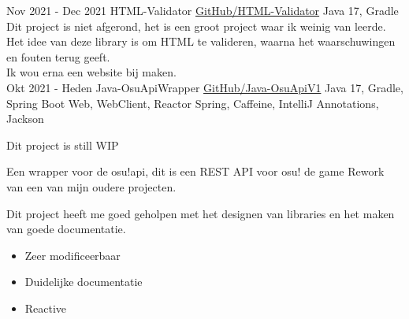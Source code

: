 \documentclass[letterpaper]{twentysecondcv} %
\begin{document}
    \begin{twenty} %
        \twentyitem
        {Nov 2021 -}
        {Dec 2021}
        {HTML-Validator}
        {\href{https://github.com/Tais993/HTML-Validator/}{GitHub/HTML-Validator}}
        {Java 17, Gradle}
        {
            Dit project is niet afgerond, het is een groot project waar ik weinig van leerde.\\

        Het idee van deze library is om HTML te valideren, waarna het waarschuwingen en fouten terug geeft.\\
        Ik wou erna een website bij maken.}\\

        \twentyitem
        {Okt 2021 -}
        {Heden}
        {Java-OsuApiWrapper}
        {\href{https://github.com/Tais993/Java-OsuApiV1/}{GitHub/Java-OsuApiV1}}
        {Java 17, Gradle, Spring Boot Web, WebClient, Reactor Spring, Caffeine, IntelliJ Annotations, Jackson}
        {
            Dit project is still WIP

            Een wrapper voor de osu!api, dit is een REST API voor osu! de game
        Rework van een van mijn oudere projecten.

        Dit project heeft me goed geholpen met het designen van libraries en het maken van goede documentatie.
            \begin{itemize}
                \item Zeer modificeerbaar
                \item Duidelijke documentatie
                \item Reactive
            \end{itemize}}\\
    \end{twenty}

    \newpage

    \makesidebarSecond %

\end{document}
